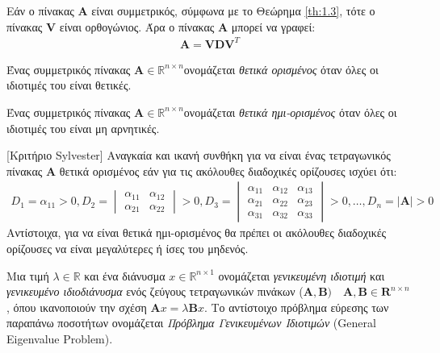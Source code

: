 \gr
\begin{proposition}\label{prop:1.1}
Εάν ο πίνακας \en $\mathbf{A}$ \gr είναι συμμετρικός, σύμφωνα με το Θεώρημα \ref{th:1.3}, τότε ο πίνακας \en $\mathbf{V}$ \gr είναι ορθογώνιος. Άρα ο πίνακας \en $\mathbf{A}$ \gr μπορεί να γραφεί:
\begin{align*}
    \mathbf{A} = \mathbf{V} \mathbf{D} \mathbf{V}^T
\end{align*}
\end{proposition}
\begin{definition}\label{def:1.4}
Ένας συμμετρικός πίνακας \en $\mathbf{A} \in \mathbb{R}^{n \times n}$\gr ονομάζεται \emph{θετικά ορισμένος} όταν όλες οι ιδιοτιμές του είναι θετικές.
\end{definition}
\begin{definition} \label{def:1.5}
Ένας συμμετρικός πίνακας \en $\mathbf{A} \in \mathbb{R}^{n \times n}$\gr ονομάζεται \emph{θετικά ημι-ορισμένος} όταν όλες οι ιδιοτιμές του είναι μη αρνητικές.
\end{definition}
\begin{theorem} \label{th:1.5} [Κριτήριο \en Sylvester]
\gr Αναγκαία και ικανή συνθήκη για να είναι ένας τετραγωνικός πίνακας \en $\mathbf{A}$ \gr θετικά ορισμένος εάν για τις ακόλουθες διαδοχικές ορίζουσες ισχύει ότι: \en
\begin{align*}
    D_{1} = \alpha_{11} > 0, 
    D_{2} = \begin{vmatrix}
    \alpha_{11} & \alpha_{12} \\
    \alpha_{21} & \alpha_{22}
    \end{vmatrix} > 0 , 
    D_{3} = \begin{vmatrix}
    \alpha_{11} & \alpha_{12} & \alpha_{13} \\
    \alpha_{21} & \alpha_{22} & \alpha_{23} \\
    \alpha_{31} & \alpha_{32} & \alpha_{33}
    \end{vmatrix} > 0, \ldots, D_{n} = |\mathbf{A}| > 0 
\end{align*}
\gr Αντίστοιχα, για να είναι θετικά ημι-ορισμένος θα πρέπει οι ακόλουθες διαδοχικές ορίζουσες να είναι μεγαλύτερες ή ίσες του μηδενός. 
\end{theorem}
\begin{definition} \label{def:1.6}
Μια τιμή \en $\lambda \in \mathbb{R}$ \gr και ένα διάνυσμα \en $x \in \mathbb{R}^{n \times 1}$ \gr ονομάζεται \emph{γενικευμένη ιδιοτιμή} και \emph{γενικευμένο ιδιοδιάνυσμα} ενός ζεύγους τετραγωνικών πινάκων \en ($\mathbf{A},\mathbf{B}) \quad \mathbf{A},\mathbf{B} \in \mathbf{R}^{n \times n}$ \gr, όπου ικανοποιούν την σχέση \en $\mathbf{A}x = \lambda \mathbf{B} x$. Το αντίστοιχο πρόβλημα εύρεσης των παραπάνω ποσοτήτων ονομάζεται \emph{Πρόβλημα Γενικευμένων Ιδιοτιμών} \en (General Eigenvalue Problem). \gr
\end{definition}
